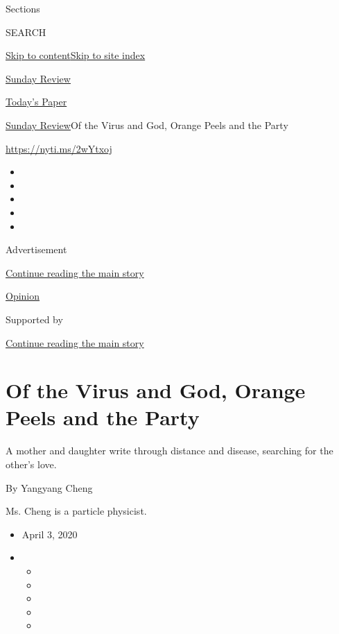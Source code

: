 Sections

SEARCH

\protect\hyperlink{site-content}{Skip to
content}\protect\hyperlink{site-index}{Skip to site index}

\href{https://www.nytimes.com/section/opinion/sunday}{Sunday Review}

\href{https://myaccount.nytimes.com/auth/login?response_type=cookie\&client_id=vi}{}

\href{https://www.nytimes.com/section/todayspaper}{Today's Paper}

\href{/section/opinion/sunday}{Sunday Review}\textbar{}Of the Virus and
God, Orange Peels and the Party

\href{https://nyti.ms/2wYtxoj}{https://nyti.ms/2wYtxoj}

\begin{itemize}
\item
\item
\item
\item
\item
\end{itemize}

Advertisement

\protect\hyperlink{after-top}{Continue reading the main story}

\href{/section/opinion}{Opinion}

Supported by

\protect\hyperlink{after-sponsor}{Continue reading the main story}

\hypertarget{of-the-virus-and-god-orange-peels-and-the-party}{%
\section{Of the Virus and God, Orange Peels and the
Party}\label{of-the-virus-and-god-orange-peels-and-the-party}}

A mother and daughter write through distance and disease, searching for
the other's love.

By Yangyang Cheng

Ms. Cheng is a particle physicist.

\begin{itemize}
\item
  April 3, 2020
\item
  \begin{itemize}
  \item
  \item
  \item
  \item
  \item
  \end{itemize}
\end{itemize}

